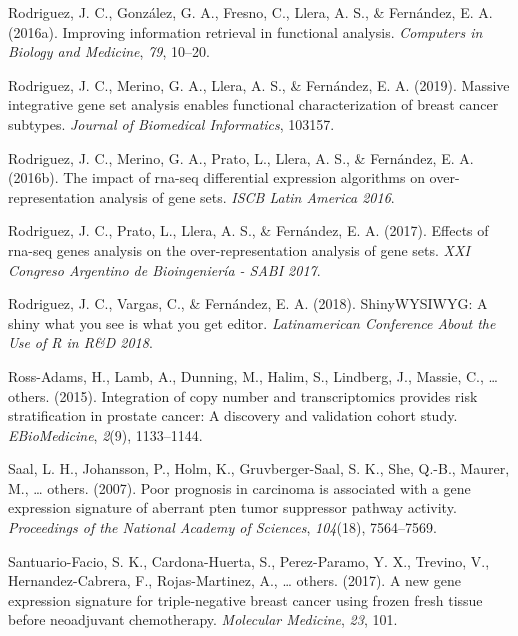 \documentclass[12pt,twoside]{reedthesis}
\begin{document}
\leavevmode\hypertarget{ref-rodriguez2016improving}{}%
Rodriguez, J. C., González, G. A., Fresno, C., Llera, A. S., \& Fernández, E. A. (2016a). Improving information retrieval in functional analysis. \emph{Computers in Biology and Medicine}, \emph{79}, 10--20.

\leavevmode\hypertarget{ref-rodriguez2019massive}{}%
Rodriguez, J. C., Merino, G. A., Llera, A. S., \& Fernández, E. A. (2019). Massive integrative gene set analysis enables functional characterization of breast cancer subtypes. \emph{Journal of Biomedical Informatics}, 103157.

\leavevmode\hypertarget{ref-rodrigueziscb}{}%
Rodriguez, J. C., Merino, G. A., Prato, L., Llera, A. S., \& Fernández, E. A. (2016b). The impact of rna-seq differential expression algorithms on over-representation analysis of gene sets. \emph{ISCB Latin America 2016}.

\leavevmode\hypertarget{ref-rodriguezsabi}{}%
Rodriguez, J. C., Prato, L., Llera, A. S., \& Fernández, E. A. (2017). Effects of rna-seq genes analysis on the over-representation analysis of gene sets. \emph{XXI Congreso Argentino de Bioingeniería - SABI 2017}.

\leavevmode\hypertarget{ref-rodriguezlatinr}{}%
Rodriguez, J. C., Vargas, C., \& Fernández, E. A. (2018). ShinyWYSIWYG: A shiny what you see is what you get editor. \emph{Latinamerican Conference About the Use of R in R\&D 2018}.

\leavevmode\hypertarget{ref-ross2015integration}{}%
Ross-Adams, H., Lamb, A., Dunning, M., Halim, S., Lindberg, J., Massie, C., \ldots{} others. (2015). Integration of copy number and transcriptomics provides risk stratification in prostate cancer: A discovery and validation cohort study. \emph{EBioMedicine}, \emph{2}(9), 1133--1144.

\leavevmode\hypertarget{ref-saal2007poor}{}%
Saal, L. H., Johansson, P., Holm, K., Gruvberger-Saal, S. K., She, Q.-B., Maurer, M., \ldots{} others. (2007). Poor prognosis in carcinoma is associated with a gene expression signature of aberrant pten tumor suppressor pathway activity. \emph{Proceedings of the National Academy of Sciences}, \emph{104}(18), 7564--7569.

\leavevmode\hypertarget{ref-santuario2017new}{}%
Santuario-Facio, S. K., Cardona-Huerta, S., Perez-Paramo, Y. X., Trevino, V., Hernandez-Cabrera, F., Rojas-Martinez, A., \ldots{} others. (2017). A new gene expression signature for triple-negative breast cancer using frozen fresh tissue before neoadjuvant chemotherapy. \emph{Molecular Medicine}, \emph{23}, 101.
\end{document}
